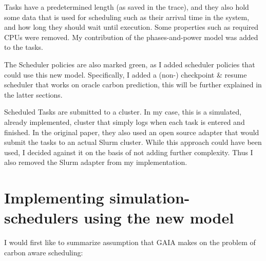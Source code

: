Tasks have a predetermined length (as saved in the trace), and they also hold some data that is used for scheduling such as their arrival time in the system, and how long they should wait until execution. 
Some properties such as required CPUs were removed.
My contribution of the phases-and-power model was added to the tasks.

The Scheduler policies are also marked green, as I added scheduler policies that could use this new model. Specifically, I added a (non-) checkpoint \& resume scheduler that works on oracle carbon prediction, this will be further explained in the latter sections.

Scheduled Tasks are submitted to a cluster.
In my case, this is a simulated, already implemented, cluster that simply logs when each task is entered and finished. 
In the original paper, they also used an open source adapter that would submit the tasks to an actual Slurm cluster. 
While this approach could have been used, I decided against it on the basis of not adding further complexity. 
Thus I also removed the Slurm adapter from my implementation.

% 

\section{Implementing simulation-schedulers using the new model}

I would first like to summarize assumption that GAIA makes on the problem of carbon aware scheduling:


